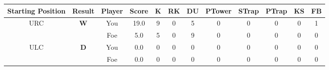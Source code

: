 \documentclass[a4paper,12pt]{article}
\begin{document}
  \begin{tabular}[t]{| c | c | c | c | c | c | c | c | c | c | c | c
      |}
    \hline
    Starting Position & \textbf{Result} & Player & \textbf{Score} & K & RK & DU & PTower & STrap & PTrap & KS & FB \\
    
      
        \hline
        \multirow{2}{*}{  URC
             } &
              \multirow{2}{*}{  \textbf{W}  } & 
                    \cellcolor{yellow!25} You & \cellcolor{yellow!25} 19.0 & \cellcolor{yellow!25} 9 &
                    \cellcolor{yellow!25} 0 & \cellcolor{yellow!25} 5 & \cellcolor{yellow!25} 0 &
                    \cellcolor{yellow!25} 0 & \cellcolor{yellow!25} 0 & \cellcolor{yellow!25} 0 &
                    \cellcolor{yellow!25} 1 \\
                    \cline{3-12}
                    & & \cellcolor{red!15} Foe & \cellcolor{red!15} 5.0 & \cellcolor{red!15} 5 & \cellcolor{red!15}
                    0 & \cellcolor{red!15} 9
                    & \cellcolor{red!15} 0 & \cellcolor{red!15}
                    0 & \cellcolor{red!15} 0 
                    & \cellcolor{red!15} 0 & \cellcolor{red!15}
                    0 \\
                    
                      
      
                      
      
                      
      
                      
      
        \hline
        \multirow{2}{*}{  ULC  } &
              \multirow{2}{*}{  
                  \textbf{D}  } & 
                    \cellcolor{yellow!25} You & \cellcolor{yellow!25} 0.0 & \cellcolor{yellow!25} 0 &
                    \cellcolor{yellow!25} 0 & \cellcolor{yellow!25} 0 & \cellcolor{yellow!25} 0 &
                    \cellcolor{yellow!25} 0 & \cellcolor{yellow!25} 0 & \cellcolor{yellow!25} 0 &
                    \cellcolor{yellow!25} 0 \\
                    \cline{3-12}
                    & & \cellcolor{red!15} Foe & \cellcolor{red!15} 0.0 & \cellcolor{red!15} 0 & \cellcolor{red!15}
                    0 & \cellcolor{red!15} 0
                    & \cellcolor{red!15} 0 & \cellcolor{red!15}
                    0 & \cellcolor{red!15} 0 
                    & \cellcolor{red!15} 0 & \cellcolor{red!15}
                    0 \\
                    

\end{tabular}
\end{document}

